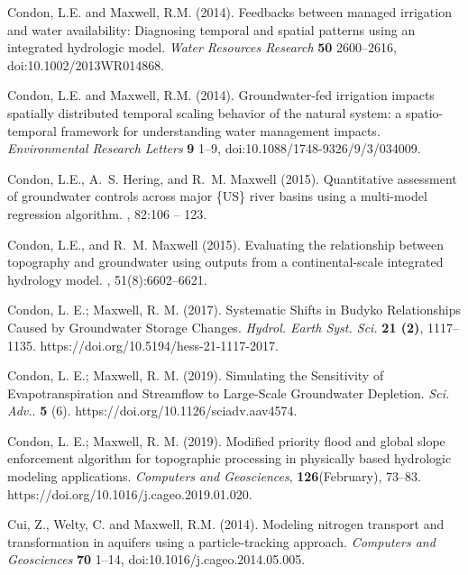 \begin{thebibliography}{999}
Condon, L.E. and Maxwell, R.M. (2014). Feedbacks between managed irrigation and water availability: Diagnosing temporal and spatial patterns using an integrated hydrologic model. {\em Water Resources Research} {\bf 50} 2600--2616, doi:10.1002/2013WR014868.

Condon, L.E. and Maxwell, R.M. (2014). Groundwater-fed irrigation impacts spatially distributed temporal scaling behavior of the natural system: a spatio-temporal framework for understanding water management impacts. {\em Environmental Research Letters} {\bf 9} 1--9, doi:10.1088/1748-9326/9/3/034009.

 Condon, L.E., A.~S. Hering, and R.~M. Maxwell (2015).
\newblock Quantitative assessment of groundwater controls across major \{US\}
  river basins using a multi-model regression algorithm.
, 82:106 -- 123.

Condon, L.E., and R.~M. Maxwell (2015).
\newblock Evaluating the relationship between topography and groundwater using
  outputs from a continental-scale integrated hydrology model.
, 51(8):6602--6621.


Condon, L. E.; Maxwell, R. M. (2017). Systematic Shifts in Budyko Relationships Caused by Groundwater Storage Changes. {\em Hydrol. Earth Syst. Sci.} {\bf 21 (2)}, 1117–1135. https://doi.org/10.5194/hess-21-1117-2017.


Condon, L. E.; Maxwell, R. M. (2019). Simulating the Sensitivity of Evapotranspiration and Streamflow to Large-Scale Groundwater Depletion. {\em Sci. Adv.}. {\bf 5} (6). https://doi.org/10.1126/sciadv.aav4574.

Condon, L. E.; Maxwell, R. M. (2019). Modified priority flood and global slope enforcement algorithm for topographic processing in physically based hydrologic modeling applications. {\em Computers and Geosciences}, {\bf 126}(February), 73–83. https://doi.org/10.1016/j.cageo.2019.01.020.



Cui, Z., Welty, C. and Maxwell, R.M. (2014).
\newblock Modeling nitrogen transport and transformation in aquifers using a particle-tracking approach. {\em Computers and Geosciences} {\bf 70} 1--14, doi:10.1016/j.cageo.2014.05.005.


\end{thebibliography}
